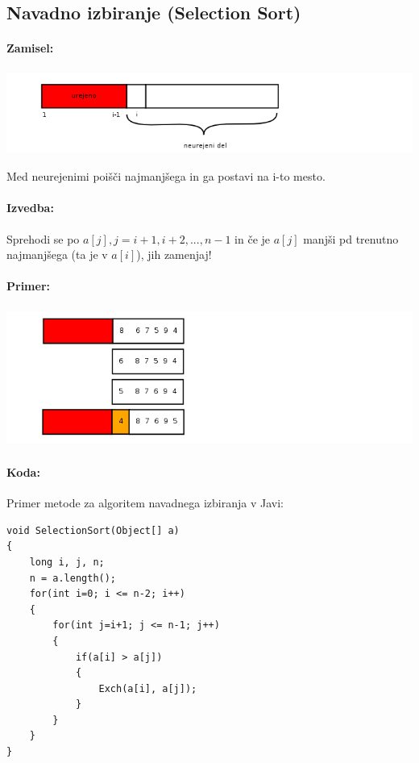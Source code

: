 \documentclass[a4paper,10pt]{article}
\begin{document}
\subsection{Navadno izbiranje (Selection Sort)}

\paragraph{Zamisel:}
	\begin{center}
	\includegraphics[width=13.75cm,height=2.7cm]{Slike/NavadnoIzbiranjeZamisel.png}
	\end{center}
Med neurejenimi poi\v s\v ci najmanj\v sega in ga postavi na i-to mesto.

\paragraph{Izvedba:}
Sprehodi se po $a[j], j= i+1,i+2,...,n-1$ in \v ce je $a[j]$ manj\v si pd trenutno najmanj\v sega (ta je v $a[i]$), jih zamenjaj!

\paragraph{Primer:}
	\begin{center}
	\includegraphics[width=13.75cm,height=4.45cm]{Slike/NavadnoIzbiranjePrimer.png}
	\end{center}

\paragraph{Koda:}
Primer metode za algoritem navadnega izbiranja v Javi:
\begin{lstlisting}
void SelectionSort(Object[] a)
{
	long i, j, n;
	n = a.length();
	for(int i=0; i <= n-2; i++)
	{
		for(int j=i+1; j <= n-1; j++)
		{
			if(a[i] > a[j])
			{
				Exch(a[i], a[j]);
			}
		}
	}
}
\end{lstlisting}
\end{document}

